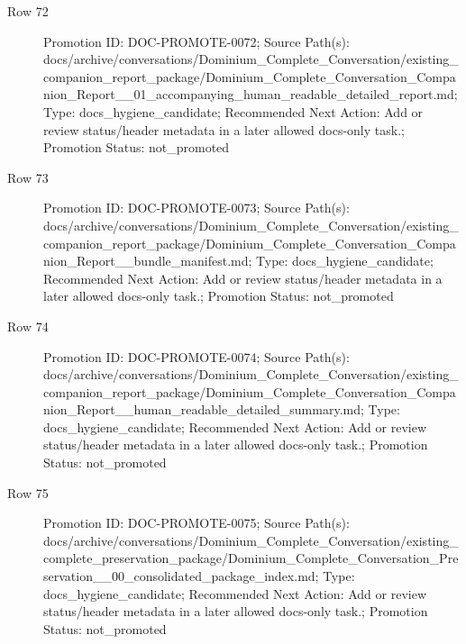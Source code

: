 \documentclass[9pt,a4paper,openany]{book}
\begin{document}
\begin{description}
\item[Row 72] Promotion ID: DOC-\allowbreak{}PROMOTE-\allowbreak{}0072; Source Path(s): docs/\allowbreak{}archive/\allowbreak{}conversations/\allowbreak{}Dominium\_\allowbreak{}Complete\_\allowbreak{}Conversation/\allowbreak{}existing\_\allowbreak{}companion\_\allowbreak{}report\_\allowbreak{}package/\allowbreak{}Dominium\_\allowbreak{}Complete\_\allowbreak{}Conversation\_\allowbreak{}Companion\_\allowbreak{}Report\_\allowbreak{}\_\allowbreak{}01\_\allowbreak{}accompanying\_\allowbreak{}human\_\allowbreak{}readable\_\allowbreak{}detailed\_\allowbreak{}report.\allowbreak{}md; Type: docs\_\allowbreak{}hygiene\_\allowbreak{}candidate; Recommended Next Action: Add or review status/\allowbreak{}header metadata in a later allowed docs-\allowbreak{}only task.\allowbreak{}; Promotion Status: not\_\allowbreak{}promoted
\item[Row 73] Promotion ID: DOC-\allowbreak{}PROMOTE-\allowbreak{}0073; Source Path(s): docs/\allowbreak{}archive/\allowbreak{}conversations/\allowbreak{}Dominium\_\allowbreak{}Complete\_\allowbreak{}Conversation/\allowbreak{}existing\_\allowbreak{}companion\_\allowbreak{}report\_\allowbreak{}package/\allowbreak{}Dominium\_\allowbreak{}Complete\_\allowbreak{}Conversation\_\allowbreak{}Companion\_\allowbreak{}Report\_\allowbreak{}\_\allowbreak{}bundle\_\allowbreak{}manifest.\allowbreak{}md; Type: docs\_\allowbreak{}hygiene\_\allowbreak{}candidate; Recommended Next Action: Add or review status/\allowbreak{}header metadata in a later allowed docs-\allowbreak{}only task.\allowbreak{}; Promotion Status: not\_\allowbreak{}promoted
\item[Row 74] Promotion ID: DOC-\allowbreak{}PROMOTE-\allowbreak{}0074; Source Path(s): docs/\allowbreak{}archive/\allowbreak{}conversations/\allowbreak{}Dominium\_\allowbreak{}Complete\_\allowbreak{}Conversation/\allowbreak{}existing\_\allowbreak{}companion\_\allowbreak{}report\_\allowbreak{}package/\allowbreak{}Dominium\_\allowbreak{}Complete\_\allowbreak{}Conversation\_\allowbreak{}Companion\_\allowbreak{}Report\_\allowbreak{}\_\allowbreak{}human\_\allowbreak{}readable\_\allowbreak{}detailed\_\allowbreak{}summary.\allowbreak{}md; Type: docs\_\allowbreak{}hygiene\_\allowbreak{}candidate; Recommended Next Action: Add or review status/\allowbreak{}header metadata in a later allowed docs-\allowbreak{}only task.\allowbreak{}; Promotion Status: not\_\allowbreak{}promoted
\item[Row 75] Promotion ID: DOC-\allowbreak{}PROMOTE-\allowbreak{}0075; Source Path(s): docs/\allowbreak{}archive/\allowbreak{}conversations/\allowbreak{}Dominium\_\allowbreak{}Complete\_\allowbreak{}Conversation/\allowbreak{}existing\_\allowbreak{}complete\_\allowbreak{}preservation\_\allowbreak{}package/\allowbreak{}Dominium\_\allowbreak{}Complete\_\allowbreak{}Conversation\_\allowbreak{}Preservation\_\allowbreak{}\_\allowbreak{}00\_\allowbreak{}consolidated\_\allowbreak{}package\_\allowbreak{}index.\allowbreak{}md; Type: docs\_\allowbreak{}hygiene\_\allowbreak{}candidate; Recommended Next Action: Add or review status/\allowbreak{}header metadata in a later allowed docs-\allowbreak{}only task.\allowbreak{}; Promotion Status: not\_\allowbreak{}promoted

\end{description}
\end{document}

